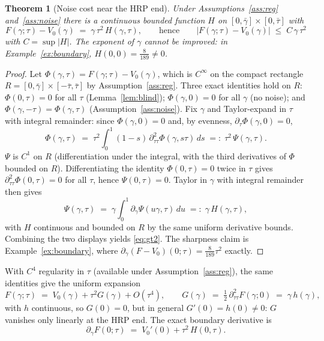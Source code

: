 \documentclass[11pt]{article}
\newtheorem{theorem}{Theorem}
\theoremstyle{remark}
\begin{document}
\begin{theorem}[Noise cost near the HRP end]
\label{thm:noisecost}
Under Assumptions~\ref{ass:reg} and~\ref{ass:noise} there is a continuous
bounded function $H$ on $[0,\bar\gamma] \times [0,\bar\tau]$ with
\begin{equation}
  F(\gamma;\tau) - V_0(\gamma) \;=\; \gamma\, \tau^2\, H(\gamma, \tau),
  \qquad\text{hence}\qquad
  \big|F(\gamma;\tau) - V_0(\gamma)\big| \;\le\; C\,\gamma\,\tau^2
  \label{eq:gt2}
\end{equation}
with $C = \sup |H|$. The exponent of $\gamma$ cannot be improved: in
Example~\ref{ex:boundary}, $H(0,0) = \tfrac{8}{189} \neq 0$.
\end{theorem}
\begin{proof}
Let $\Phi(\gamma, \tau) = F(\gamma;\tau) - V_0(\gamma)$, which is $C^\infty$
on the compact rectangle $R = [0,\bar\gamma] \times [-\bar\tau, \bar\tau]$
by Assumption~\ref{ass:reg}. Three exact identities hold on $R$:
$\Phi(0, \tau) = 0$ for all $\tau$ (Lemma~\ref{lem:blind});
$\Phi(\gamma, 0) = 0$ for all $\gamma$ (no noise); and
$\Phi(\gamma, -\tau) = \Phi(\gamma, \tau)$ (Assumption~\ref{ass:noise}).
Fix $\gamma$ and Taylor-expand in $\tau$ with integral remainder: since
$\Phi(\gamma, 0) = 0$ and, by evenness, $\partial_\tau \Phi(\gamma, 0) = 0$,
\[
  \Phi(\gamma, \tau)
  \;=\; \tau^2 \int_0^1 (1-s)\, \partial^2_{\tau\tau}
        \Phi(\gamma, s\tau)\, ds
  \;=:\; \tau^2\, \Psi(\gamma, \tau).
\]
$\Psi$ is $C^1$ on $R$ (differentiation under the integral, with the third
derivatives of $\Phi$ bounded on $R$). Differentiating the identity
$\Phi(0,\tau) = 0$ twice in $\tau$ gives
$\partial^2_{\tau\tau}\Phi(0, \tau) = 0$ for all $\tau$, hence
$\Psi(0, \tau) = 0$. Taylor in $\gamma$ with integral remainder then gives
\[
  \Psi(\gamma, \tau) \;=\; \gamma \int_0^1
  \partial_\gamma \Psi(u\gamma, \tau)\, du \;=:\; \gamma\, H(\gamma, \tau),
\]
with $H$ continuous and bounded on $R$ by the same uniform derivative
bounds. Combining the two displays yields \eqref{eq:gt2}. The sharpness
claim is Example~\ref{ex:boundary}, where
$\partial_\gamma(F - V_0)(0; \tau) = \tfrac{8}{189}\tau^2$ exactly.
\end{proof}

With $C^4$ regularity in $\tau$ (available under Assumption~\ref{ass:reg}),
the same identities give the uniform expansion
\begin{equation}
  F(\gamma;\tau) \;=\; V_0(\gamma) + \tau^2 G(\gamma) + O(\tau^4),
  \qquad
  G(\gamma) \;=\; \tfrac12\,\partial^2_{\tau\tau} F(\gamma; 0)
  \;=\; \gamma\, h(\gamma),
  \label{eq:expansion}
\end{equation}
with $h$ continuous, so $G(0) = 0$, but in general
$G'(0) = h(0) \ne 0$: $G$ vanishes only linearly at the HRP end. The exact
boundary derivative is
\begin{equation}
  \partial_\gamma F(0;\tau) \;=\; V_0'(0) + \tau^2\, H(0, \tau).
  \label{eq:boundarycalc}
\end{equation}
\end{document}
